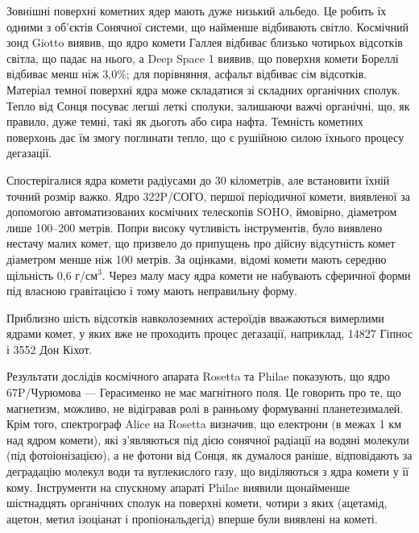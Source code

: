 \documentclass[a4paper]{article}
\begin{document}
    Зовнішні поверхні кометних ядер мають дуже низький альбедо. Це робить їх одними з об’єктів Сонячної системи, що найменше відбивають світло. Космічний зонд Giotto виявив, що ядро комети Галлея відбиває близько чотирьох відсотків світла, що падає на нього, а Deep Space 1 виявив, що поверхня комети Бореллі відбиває менш ніж 3,0\%; для порівняння, асфальт відбиває сім відсотків. Матеріал темної поверхні ядра може складатися зі складних органічних сполук. Тепло від Сонця посуває легші леткі сполуки, залишаючи важчі органічні, що, як правило, дуже темні, такі як дьоготь або сира нафта. Темність кометних поверхонь дає їм змогу поглинати тепло, що є рушійною силою їхнього процесу дегазації.
    
    Спостерігалися ядра комети радіусами до 30 кілометрів, але встановити їхній точний розмір важко. Ядро 322P/СОГО, першої періодичної комети, виявленої за допомогою автоматизованих космічних телескопів SOHO, ймовірно, діаметром лише 100--200 метрів. Попри високу чутливість інструментів, було виявлено нестачу малих комет, що призвело до припущень про дійсну відсутність комет діаметром менше ніж 100 метрів. За оцінками, відомі комети мають середню щільність 0,6 г/см$^3$. Через малу масу ядра комети не набувають сферичної форми під власною гравітацією і тому мають неправильну форму.
    
    Приблизно шість відсотків навколоземних астероїдів вважаються вимерлими ядрами комет, у яких вже не проходить процес дегазації, наприклад, 14827 Гіпнос і 3552 Дон Кіхот.
    
    Результати дослідів космічного апарата Rosetta та Philae показують, що ядро 67P/Чурюмова --- Герасименко не має магнітного поля. Це говорить про те, що магнетизм, можливо, не відігравав ролі в ранньому формуванні планетезималей. Крім того, спектрограф Alice на Rosetta визначив, що електрони (в межах 1 км над ядром комети), які з'являються під дією сонячної радіації на водяні молекули (під фотоіонізацією), а не фотони від Сонця, як думалося раніше, відповідають за деградацію молекул води та вуглекислого газу, що виділяються з ядра комети у її кому. Інструменти на спускному апараті Philae виявили щонайменше шістнадцять органічних сполук на поверхні комети, чотири з яких (ацетамід, ацетон, метил ізоціанат і пропіональдегід) вперше були виявлені на кометі.
    
\end{document}
